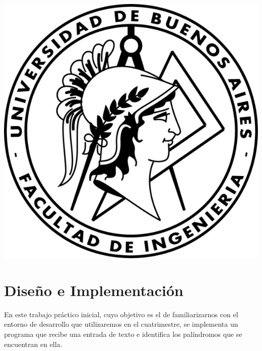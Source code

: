 \documentclass[a4paper, 10pt]{article}
\begin{document}
    \newpage

    \begin{center}
        \includegraphics{images/logo}
    \end{center}


    \maketitle
    \newpage
    \tableofcontents
    \newpage
	\section{Diseño e Implementación}
		En este trabajo práctico inicial, cuyo objetivo es el de familiarizarnos con el
		entorno de desarrollo que utilizaremos en el cuatrimestre, se implementa un programa
		que recibe una entrada de texto e identifica los palíndromos que se encuentran en
		ella.
\end{document}
